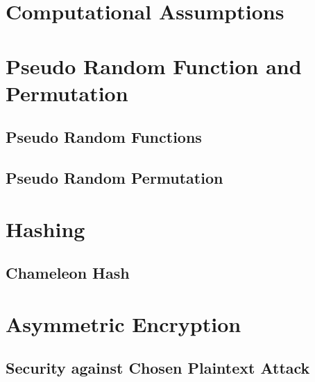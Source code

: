








\maketitle

\ifTableOfContents 
	\tableofcontents
	\newpage
\fi

\chapter{Computational Assumptions}

\chapter{Pseudo Random Function and Permutation}
	\section{Pseudo Random Functions}
	
	\section{Pseudo Random Permutation}

\chapter{Hashing}
	\section{Chameleon Hash}
	

\chapter{Asymmetric Encryption}
	\section{Security against Chosen Plaintext Attack}
	

